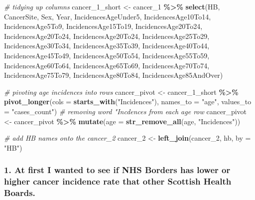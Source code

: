 \documentclass[
]{article}
\newenvironment{Shaded}{\begin{snugshade}}{\end{snugshade}}
\newcommand{\AttributeTok}[1]{\textcolor[rgb]{0.13,0.29,0.53}{#1}}
\newcommand{\CommentTok}[1]{\textcolor[rgb]{0.56,0.35,0.01}{\textit{#1}}}
\newcommand{\FunctionTok}[1]{\textcolor[rgb]{0.13,0.29,0.53}{\textbf{#1}}}
\newcommand{\NormalTok}[1]{#1}
\newcommand{\OtherTok}[1]{\textcolor[rgb]{0.56,0.35,0.01}{#1}}
\newcommand{\SpecialCharTok}[1]{\textcolor[rgb]{0.81,0.36,0.00}{\textbf{#1}}}
\newcommand{\StringTok}[1]{\textcolor[rgb]{0.31,0.60,0.02}{#1}}
\begin{document}
\begin{Shaded}
\begin{Highlighting}[]
\CommentTok{\# tidying up columns}
\NormalTok{cancer\_1\_short }\OtherTok{\textless{}{-}}\NormalTok{ cancer\_1 }\SpecialCharTok{\%\textgreater{}\%} \FunctionTok{select}\NormalTok{(HB, CancerSite, Sex, Year, IncidencesAgeUnder5, IncidencesAge10To14, IncidencesAge5To9, IncidencesAge15To19, IncidencesAge20To24, IncidencesAge20To24, IncidencesAge20To24, IncidencesAge25To29, IncidencesAge30To34, IncidencesAge35To39, IncidencesAge40To44, IncidencesAge45To49, IncidencesAge50To54, IncidencesAge55To59, IncidencesAge60To64, IncidencesAge65To69, IncidencesAge70To74, IncidencesAge75To79, IncidencesAge80To84, IncidencesAge85AndOver)}

\CommentTok{\# pivoting age incidences into rows}
\NormalTok{cancer\_pivot }\OtherTok{\textless{}{-}}\NormalTok{ cancer\_1\_short }\SpecialCharTok{\%\textgreater{}\%} \FunctionTok{pivot\_longer}\NormalTok{(}\AttributeTok{cols =} \FunctionTok{starts\_with}\NormalTok{(}\StringTok{"Incidences"}\NormalTok{), }\AttributeTok{names\_to =} \StringTok{"age"}\NormalTok{, }\AttributeTok{values\_to =} \StringTok{"cases\_count"}\NormalTok{)}
\CommentTok{\# removing word "Incdences from each age row}
\NormalTok{cancer\_pivot }\OtherTok{\textless{}{-}}\NormalTok{ cancer\_pivot }\SpecialCharTok{\%\textgreater{}\%} \FunctionTok{mutate}\NormalTok{(}\AttributeTok{age =} \FunctionTok{str\_remove\_all}\NormalTok{(age, }\StringTok{"Incidences"}\NormalTok{))}
\end{Highlighting}
\end{Shaded}

\begin{Shaded}
\begin{Highlighting}[]
\CommentTok{\# add HB names onto the cancer\_2}
\NormalTok{cancer\_2 }\OtherTok{\textless{}{-}} \FunctionTok{left\_join}\NormalTok{(cancer\_2, hb, }\AttributeTok{by =} \StringTok{"HB"}\NormalTok{)}
\end{Highlighting}
\end{Shaded}

\hypertarget{at-first-i-wanted-to-see-if-nhs-borders-has-lower-or-higher-cancer-incidence-rate-that-other-scottish-health-boards.}{%
\subsubsection{1. At first I wanted to see if NHS Borders has lower or
higher cancer incidence rate that other Scottish Health
Boards.}\label{at-first-i-wanted-to-see-if-nhs-borders-has-lower-or-higher-cancer-incidence-rate-that-other-scottish-health-boards.}}
\end{document}
